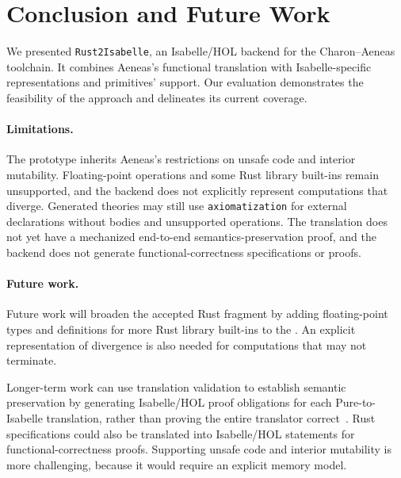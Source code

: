 \section{Conclusion and Future Work}
\label{sec:conclusion}

We presented \texttt{Rust2Isabelle}, an Isabelle/HOL backend for the Charon--Aeneas toolchain.
It combines Aeneas's functional translation with Isabelle-specific representations and primitives' support.
Our evaluation demonstrates the feasibility of the approach and delineates its current coverage.

\paragraph{Limitations.}
The prototype inherits Aeneas's restrictions on unsafe code and interior mutability.
Floating-point operations and some Rust library built-ins remain unsupported, and the backend does not explicitly represent computations that diverge.
Generated theories may still use \texttt{axiomatization} for external declarations without bodies and unsupported operations.
The translation does not yet have a mechanized end-to-end semantics-preservation proof, and the backend does not generate functional-correctness specifications or proofs.


\paragraph{Future work.}
Future work will broaden the accepted Rust fragment by adding floating-point types and definitions for more Rust library built-ins to the \rprelude{}.
An explicit representation of divergence is also needed for computations that may not terminate.

Longer-term work can use translation validation to establish semantic preservation by generating Isabelle/HOL proof obligations for each Pure-to-Isabelle translation, rather than proving the entire translator correct~\cite{Pnueli1998}.
Rust specifications could also be translated into Isabelle/HOL statements for functional-correctness proofs.
Supporting unsafe code and interior mutability is more challenging, because it would require an explicit memory model.
